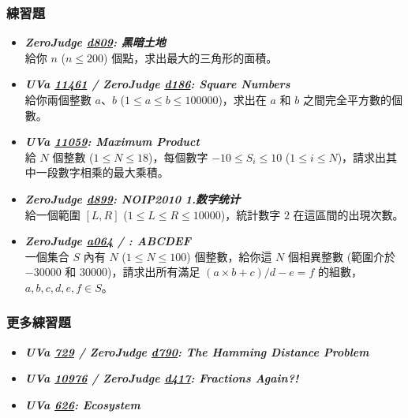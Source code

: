 \subsubsection*{練習題}
\begin{itemize}[label={\Checkmark}]
\item \textbf{\textit{ZeroJudge \href{http://zerojudge.tw/ShowProblem?problemid=d809}{d809}: 黑暗土地}}\\
給你 $n$ ($n\leq{200}$) 個點，求出最大的三角形的面積。
\item \textbf{\textit{UVa \href{http://uva.onlinejudge.org/external/114/11461.html}{11461} / ZeroJudge \href{http://zerojudge.tw/ShowProblem?problemid=d186}{d186}: Square Numbers}}\\
給你兩個整數 $a$、$b$ ($1\leq{a}\leq{b}\leq{100000}$)，求出在 $a$ 和 $b$ 之間完全平方數的個數。
\item \textbf{\textit{UVa \href{http://uva.onlinejudge.org/external/110/11059.html}{11059}: Maximum Product}}\\
給 $N$ 個整數 ($1\leq{N}\leq{18}$)，每個數字 $-10\leq{S_i}\leq{10}$ ($1\leq{i}\leq{N}$)，請求出其中一段數字相乘的最大乘積。
\item \textbf{\textit{ZeroJudge \href{http://zerojudge.tw/ShowProblem?problemid=d899}{d899}: NOIP2010 1.数字统计}}\\
給一個範圍 $[L,R]$ ($1\leq{L}\leq{R}\leq{10000}$)，統計數字 $2$ 在這區間的出現次數。
\item \textbf{\textit{ZeroJudge \href{http://zerojudge.tw/ShowProblem?problemid=a064}{a064} /  \href{}{}: ABCDEF}}\\
一個集合 $S$ 內有 $N$ ($1\leq{N}\leq{100}$) 個整數，給你這 $N$ 個相異整數 (範圍介於 $-30000$ 和 $30000$)，請求出所有滿足 $(a\times{b}+c)/d-e=f$ 的組數，$a,b,c,d,e,f\in{S}$。
\end{itemize}
\subsubsection*{更多練習題}
\begin{itemize}[label={\PencilLeftDown}]
\item \textbf{\textit{UVa \href{http://uva.onlinejudge.org/external/7/729.html}{729} / ZeroJudge \href{http://zerojudge.tw/ShowProblem?problemid=d790}{d790}: The Hamming Distance Problem}}
\item \textbf{\textit{UVa \href{http://uva.onlinejudge.org/external/109/10976.html}{10976} / ZeroJudge \href{http://zerojudge.tw/ShowProblem?problemid=d417}{d417}: Fractions Again?!}}
\item \textbf{\textit{UVa \href{http://uva.onlinejudge.org/external/6/626.html}{626}: Ecosystem}}
\end{itemize}